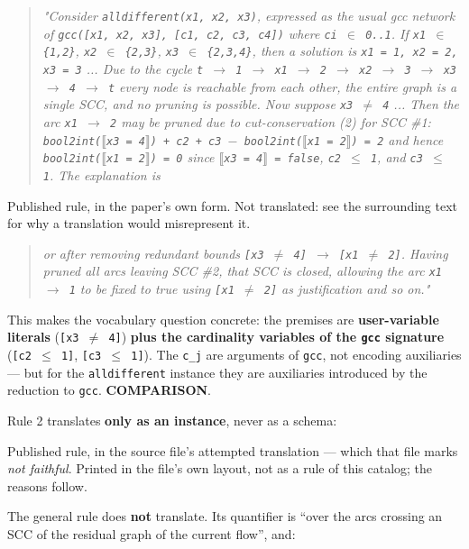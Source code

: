 \documentclass[10pt,a4paper]{article}
\newcommand{\provtag}[2]{{\small\sffamily\bfseries\textcolor{#1}{#2}}}
\newenvironment{pubblock}{%
  \par\smallskip
  \def\FrameCommand{\textcolor{litbar}{\vrule width 2.5pt}\hspace{9pt}}%
  \MakeFramed{\advance\hsize-\width\FrameRestore}}%
  {\endMakeFramed\par\smallskip}
\newcommand{\litsub}[1]{\par\smallskip{\sffamily\bfseries\textcolor{litbar}{#1}\par}}
\newcommand{\rulekind}[1]{\par{\small\sffamily\textcolor{litbar}{#1}\par}}
\newcommand{\litline}[1]{\noindent
  \resizebox{\ifdim\width>\linewidth\linewidth\else\width\fi}{!}{#1}\par}
\begin{document}
\begin{pubblock}
\begin{quotation}\small\itshape
"Consider \texttt{alldifferent(x1, x2, x3)}, expressed as the usual gcc network of \texttt{gcc([x1, x2, x3], [c1, c2, c3, c4])} where \texttt{ci $\in$ 0..1}. If \texttt{x1 $\in$ \{1,2\}}, \texttt{x2 $\in$ \{2,3\}}, \texttt{x3 $\in$ \{2,3,4\}}, then a solution is \texttt{x1 = 1, x2 = 2, x3 = 3} ... Due to the cycle \texttt{t $\rightarrow$ 1 $\rightarrow$ x1 $\rightarrow$ 2 $\rightarrow$ x2 $\rightarrow$ 3 $\rightarrow$ x3 $\rightarrow$ 4 $\rightarrow$ t} every node is reachable from each other, the entire graph is a single SCC, and no pruning is possible. Now suppose \texttt{x3 $\neq$ 4} ... Then the arc \texttt{x1 $\rightarrow$ 2} may be pruned due to cut-conservation (2) for SCC \#1: \texttt{bool2int($\llbracket$x3 = 4$\rrbracket$) + c2 + c3 $-\allowbreak{}$ bool2int($\llbracket$x1 = 2$\rrbracket$) = 2} and hence \texttt{bool2int($\llbracket$x1 = 2$\rrbracket$) = 0} since \texttt{$\llbracket$x3 = 4$\rrbracket$ = false}, \texttt{c2 $\leq$ 1}, and \texttt{c3 $\leq$ 1}. The explanation is
\end{quotation}
\rulekind{Published rule, in the paper's own form. Not translated: see the surrounding text for why a translation would misrepresent it.}
{\raggedright
\litline{\ttfamily\small [x3 $\neq$ 4] $\wedge$ [c2 $\leq$ 1] $\wedge$ [c3 $\leq$ 1] $\rightarrow$ [x1 $\neq$ 2]}
\par}
\begin{quotation}\small\itshape
or after removing redundant bounds \texttt{[x3 $\neq$ 4] $\rightarrow$ [x1 $\neq$ 2]}. Having pruned all arcs leaving SCC \#2, that SCC is closed, allowing the arc \texttt{x1 $\rightarrow$ 1} to be fixed to true using \texttt{[x1 $\neq$ 2]} as justification and so on."
\end{quotation}
This makes the vocabulary question concrete: the premises are \textbf{user-variable literals} (\texttt{[x3 $\neq$ 4]}) \textbf{plus the cardinality variables of the \texttt{gcc} signature} (\texttt{[c2 $\leq$ 1]}, \texttt{[c3 $\leq$ 1]}). The \texttt{c\_j} are arguments of \texttt{gcc}, not encoding auxiliaries --- but for the \texttt{alldifferent} instance they are auxiliaries introduced by the reduction to \texttt{gcc}. \provtag{tagcomparison}{COMPARISON}.

\par\smallskip
\litsub{Translation to this repo's notation}
Rule 2 translates \textbf{only as an instance}, never as a schema:

\rulekind{Published rule, in the source file's attempted translation --- which that file marks \emph{not faithful}. Printed in the file's own layout, not as a rule of this catalog; the reasons follow.}
{\raggedright
\litline{\ttfamily\small X\_3 $\neq$ 4,~~C\_2 $\leq$ 1,~~C\_3 $\leq$ 1}
\litline{\ttfamily\small ------------------------------- $\vdash$~~~~~~~~(AC)}
\litline{\ttfamily\small X\_1 $\neq$ 2}
\par}
The general rule does \textbf{not} translate. Its quantifier is ``over the arcs crossing an SCC of the residual graph of the current flow'', and:


\end{pubblock}
\end{document}
